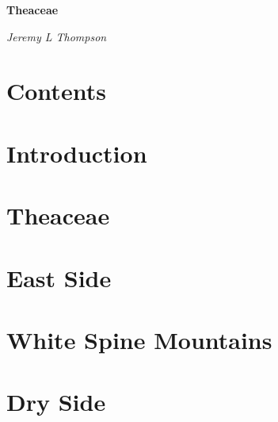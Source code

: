 \documentclass[twoside, openany]{book}
\begin{document}
\begin{titlepage}
\centering

{\Huge\bfseries\color{firebrick} Theaceae\par}
\vspace{2cm}
{\large\itshape Jeremy L Thompson}

\end{titlepage}
\thispagestyle{empty}

\chapter*{Contents}

\begin{multicols}{2}
\makeatletter
\large{
}
\makeatother
\end{multicols}

\chapter*{Introduction}



\chapter{Theaceae}



\chapter{East Side}



\chapter{White Spine Mountains}



\chapter{Dry Side}


\end{document}
